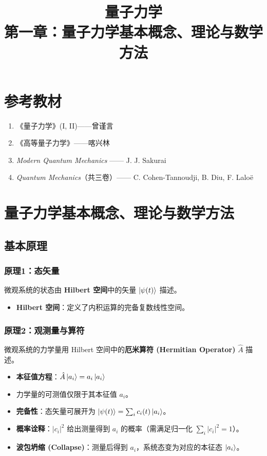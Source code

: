 \documentclass[12pt,a4paper]{article}
\title{量子力学\\第一章：量子力学基本概念、理论与数学方法}
\author{}
\date{}
\begin{document}
\maketitle
\thispagestyle{empty}
\tableofcontents
\newpage

\section*{参考教材}

\begin{enumerate}
    \item 《量子力学》(I, II)——曾谨言
    \item 《高等量子力学》——喀兴林
    \item \textit{Modern Quantum Mechanics} —— J. J. Sakurai
    \item \textit{Quantum Mechanics}（共三卷）—— C. Cohen-Tannoudji, B. Diu, F. Laloë
\end{enumerate}

\section{量子力学基本概念、理论与数学方法}

\subsection{基本原理}

\subsubsection{原理1：态矢量}

微观系统的状态由 \textbf{Hilbert 空间}中的矢量 $\ket{\psi(t)}$ 描述。

\begin{itemize}
    \item \textbf{Hilbert 空间}：定义了内积运算的完备复数线性空间。
\end{itemize}

\subsubsection{原理2：观测量与算符}

微观系统的力学量用 Hilbert 空间中的\textbf{厄米算符 (Hermitian Operator)} $\hat{A}$ 描述。

\begin{itemize}
    \item \textbf{本征值方程}：$\hat{A}\ket{a_i}=a_i\ket{a_i}$
    \item 力学量的可测值仅限于其本征值 $a_i$。
    \item \textbf{完备性}：态矢量可展开为 $\ket{\psi(t)}=\sum_i c_i(t)\ket{a_i}$。
    \item \textbf{概率诠释}：$|c_i|^2$ 给出测量得到 $a_i$ 的概率（需满足归一化 $\sum_i|c_i|^2=1$）。
    \item \textbf{波包坍缩 (Collapse)}：测量后得到 $a_i$，系统态变为对应的本征态 $\ket{a_i}$。
\end{itemize}
\end{document}
